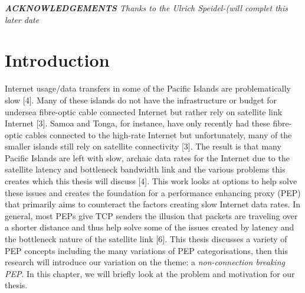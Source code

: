 \documentclass{uathesis}
\begin{document}
\vfill
\noindent \textit{\textbf{ACKNOWLEDGEMENTS} Thanks to the Ulrich Speidel-(will complet this later date} %
\\








\chapter{Introduction}

Internet usage/data transfers in some of the Pacific Islands are problematically slow [4]. Many of these islands do not have the infrastructure or budget for undersea fibre-optic cable connected Internet but rather rely on satellite link Internet [3]. Samoa and Tonga, for instance, have only recently had these fibre-optic cables connected to the high-rate Internet but unfortunately, many of the smaller islands still rely on satellite connectivity [3]. The result is that many Pacific Islands are left with slow, archaic data rates for the Internet due to the satellite latency and bottleneck bandwidth link and the various problems this creates which this thesis will discuss [4]. This work looks at options to help solve these issues and creates the foundation for a performance enhancing proxy (PEP) that primarily aims to counteract the factors creating slow Internet data rates. In general, most PEPs give TCP senders the illusion that packets are traveling over a shorter distance and thus help solve some of the issues created by latency and the bottleneck nature of the satellite link [6]. This thesis discusses a variety of PEP concepts including the many variations of PEP categorisations, then this research will introduce our variation on the theme: a \emph{non-connection breaking PEP}. In this chapter, we will briefly look at the problem and motivation for our thesis. 
\end{document}
